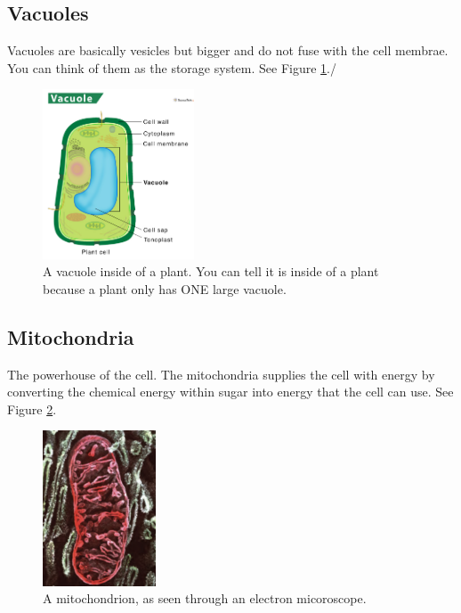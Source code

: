 \documentclass[12pt]{report}
\begin{document}
\subsection{Vacuoles}
\begin{definition}[Vacuoles]
    Vacuoles are basically vesicles but bigger and do not fuse with the cell membrae. You can think of them as the storage system. See Figure \ref{fig:vacuoles}./ 
\end{definition}

\begin{figure}[H]
\centering
    \includegraphics[width=0.4\textwidth]{../figures/vacuole.jpg}
    \caption{A vacuole inside of a plant. You can tell it is inside of a plant because a plant only has ONE large vacuole.}
    \label{fig:vacuoles}
\end{figure}

\subsection{Mitochondria}
\begin{definition}[Mitochondria]
    The powerhouse of the cell. The mitochondria supplies the cell with energy by converting the chemical energy within sugar into energy that the cell can use. See Figure \ref{fig:mitochondria}.
\end{definition}

\begin{figure}[H]
\centering
    \includegraphics[width=0.3\textwidth]{../figures/mitochondria.png}
    \caption{A mitochondrion, as seen through an electron micoroscope.}
    \label{fig:mitochondria}
\end{figure}
\end{document}
